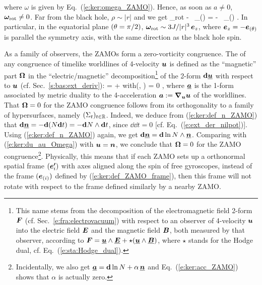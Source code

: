 \ee
where $\omega$ is given by Eq.~(\ref{e:ker:omega_ZAMO}).
Hence, as soon as $a\neq 0$, $\bm{\omega}_{\rm rot} \neq 0$.
Far from the black hole, $\rho\sim |r|$ and we get
\be \label{e:ker:rot_ZAMO_asymp}
     \w{\omega}_{\rm rot} 
     -   \sin\th \, _{(\th)}
     = -  \sin\th \, _{(\th)} .
\ee
In particular, in the equatorial plane $(\theta=\pi/2)$, $\bm{\omega}_{\rm rot} \sim 3 J/|r|^3 \, \bm{e}_z$,
where $\bm{e}_z = - \bm{e}_{(\theta)}$ is parallel the symmetry axis, with the same direction as
the black hole spin.

\begin{remark}
As a family of observers, the ZAMOs form a zero-vorticity congruence.
The  of any congruence of timelike worldlines of
4-velocity $\bm{u}$ is defined as the ``magnetic'' part $\bm{\Omega}$ in the ``electric/magnetic''
decomposition\footnote{This name stems from the decomposition of the electromagnetic field 2-form $\bm{F}$ (cf. Sec.~\ref{e:fra:electrovacuum})
with respect to an observer of 4-velocity $\bm{u}$ into the electric field
$\bm{E}$ and the magnetic field $\bm{B}$, both measured by that observer, according to
$\bm{F} = \underline{\bm{u}}\wedge\underline{\bm{E}} + \star (\underline{\bm{u}}\wedge\underline{\bm{B}})$, where $\star$ stands
for the Hodge dual, cf. Eq.~(\ref{e:sta:Hodge_dual}).}
of the 2-form $\mathbf{d}\underline{\bm{u}}$ with respect to $\bm{u}$ (cf. Sec.~\ref{s:bas:ext_deriv}):
\be \label{e:ker:du_au_Omega}
    \dd{} = \wedge {} + \w{\Omega} \quad\mbox{with}\quad \w{\Omega}(, \cdot) = 0 ,
\ee
where $\underline{\bm{a}}$ is the 1-form associated by metric duality to the 4-acceleration $\bm{a} := \bm{\nabla}_{\bm{u}} \bm{u}$
of the worldlines. That $\bm{\Omega} = 0$ for the ZAMO congruence follows from
its orthogonality to a family of hypersurfaces, namely $(\Sigma_t)_{t\in\mathbb{R}}$.
Indeed, we deduce from (\ref{e:ker:def_n_ZAMO}) that $\mathbf{d} \underline{\bm{n}} = - \mathbf{d}(N \mathbf{d} t) = - \mathbf{d} N \wedge \mathbf{d} t$,
since $\dd \dd t = 0$ [cf. Eq.~(\ref{e:ext_der_nilpot})]. Using (\ref{e:ker:def_n_ZAMO}) again, we
get $\mathbf{d} \underline{\bm{n}} = \mathbf{d} \ln N \wedge \underline{\bm{n}}$. Comparing with (\ref{e:ker:du_au_Omega}) with $\bm{u} = \bm{n}$, we conclude that
$\bm{\Omega} = 0$ for the ZAMO congruence\footnote{Incidentally, we also get $\underline{\bm{a}} = \mathbf{d} \ln N + \alpha \, \underline{\bm{n}}$
and Eq.~(\ref{e:ker:acc_ZAMO}) shows that $\alpha$ is actually zero.}.
Physically, this means that if each ZAMO sets up a orthonormal spatial frame $(\bm{e'}_i)$ with axes aligned along
the spin of free gyroscopes, instead of the frame $(\bm{e}_{(i)})$ defined by
(\ref{e:ker:def_ZAMO_frame}), then this frame will not rotate with respect to the frame defined
similarly by a nearby ZAMO.
\end{remark}

